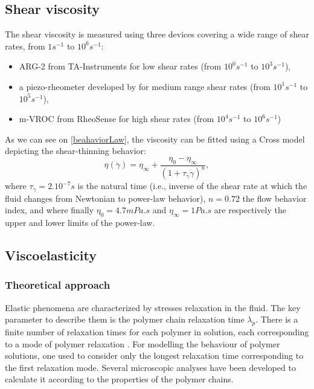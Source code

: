 \documentclass[twocolumn,10pt]{asme2ej}
\begin{document}
\subsection{Shear viscosity}
The shear viscosity is measured using three devices covering a wide range of shear rates, from $1s^{-1}$ to $10^6 s^{-1}$:
\begin{itemize}
    \item ARG-2 from TA-Instruments for low shear rates (from $10^0 s^{-1}$ to $10^3 s^{-1}$),
    \item a piezo-rheometer developed by \cite{buchanan2005high} for medium range shear rates (from $10^1 s^{-1}$ to $10^5 s^{-1}$),
    \item m-VROC from RheoSense for high shear rates (from $10^4 s^{-1}$ to $10^6 s^{-1}$)
\end{itemize}
As we can see on \ref{beahaviorLaw}, the viscosity can be fitted using a Cross model depicting the shear-thinning behavior:
\begin{equation}
    \eta(\dot{\gamma})=\eta_{\infty} + \frac{\eta_0 - \eta_{\infty}}{(1+\tau_{\dot{\gamma}} \dot{\gamma})^{n}},
    \label{crossEq}
  \end{equation}
where $\tau_{\dot{\gamma}}=2.10^{-7}s$ is the natural time (i.e., inverse of the shear rate at which the fluid changes from Newtonian to power-law behavior), $n=0.72$ the flow behavior index, and where finally $\eta_0=4.7 mPa.s $ and $\eta_\infty = 1 Pa.s$ are respectively the upper and lower limits of the power-law.



\subsection*{Viscoelasticity}
\subsubsection*{Theoretical approach}
Elastic phenomena are characterized by stresses relaxation in the fluid. The key parameter to describe them is the polymer chain relaxation time $\lambda_p$. There is a finite number of relaxation times for each polymer in solution, each corresponding to a mode of polymer relaxation \cite{de1979scaling}. For modelling the behaviour of polymer solutions, one used to consider only the longest relaxation time corresponding to the first relaxation mode. Several microscopic analyses have been developed to calculate it according to the properties of the polymer chains.
\end{document}
